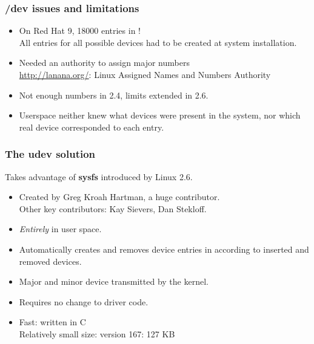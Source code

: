 
\begin{frame}
  \frametitle{/dev issues and limitations}
  \begin{itemize}
  \item On Red Hat 9, 18000 entries in !\\
    All entries for all possible devices had to be created at system
    installation.
  \item Needed an authority to assign major numbers\\
    \url{http://lanana.org/}: Linux Assigned Names and Numbers
    Authority
  \item Not enough numbers in 2.4, limits extended in 2.6.
  \item Userspace neither knew what devices were present in the
    system, nor which real device corresponded to each 
    entry.
  \end{itemize}
\end{frame}

\begin{frame}
  \frametitle{The udev solution}
  Takes advantage of {\bf sysfs} introduced by Linux 2.6.
  \begin{itemize}
  \item Created by Greg Kroah Hartman, a huge contributor.\\
    Other key contributors: Kay Sievers, Dan Stekloff.
  \item {\em Entirely} in user space.
  \item Automatically creates and removes device entries in
     according to inserted and removed devices.
  \item Major and minor device transmitted by the kernel.
  \item Requires no change to driver code.
  \item Fast: written in C\\
    Relatively small size:  version 167: 127 KB
  \end{itemize}
\end{frame}

